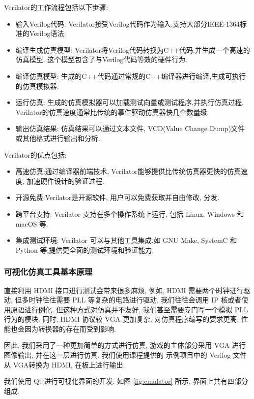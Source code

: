 Verilator的工作流程包括以下步骤: 

\begin{itemize}
    \item 输入Verilog代码: Verilator接受Verilog代码作为输入,支持大部分IEEE-1364标准的Verilog语法. 
    \item 编译生成仿真模型: Verilator将Verilog代码转换为C++代码,并生成一个高速的仿真模型. 这个模型包含了与Verilog代码等效的硬件行为. 
    \item 编译仿真模型: 生成的C++代码通过常规的C++编译器进行编译,生成可执行的仿真模拟器. 
    \item 运行仿真: 生成的仿真模拟器可以加载测试向量或测试程序,并执行仿真过程. Verilator的仿真速度通常比传统的事件驱动仿真器快几个数量级. 
    \item 输出仿真结果: 仿真结果可以通过文本文件, VCD(Value Change Dump)文件或其他格式进行输出和分析. 
\end{itemize}

Verilator的优点包括:

\begin{itemize}
    \item 高速仿真:通过编译器前端技术, Verilator能够提供比传统仿真器更快的仿真速度, 加速硬件设计的验证过程. 
    \item 开源免费:Verilator是开源软件, 用户可以免费获取并自由修改, 分发. 
    \item 跨平台支持: Verilator 支持在多个操作系统上运行, 包括 Linux, Windows 和 macOS 等. 
    \item 集成测试环境: Verilator 可以与其他工具集成,如 GNU Make, SystemC 和 Python 等,提供更全面的测试环境和验证能力. 
\end{itemize}

\subsubsection{可视化仿真工具基本原理}

直接利用 HDMI 接口进行测试会带来很多麻烦, 例如, HDMI 需要两个时钟进行驱动, 但多时钟往往需要 PLL 等复杂的电路进行驱动, 
我们往往会调用 IP 核或者使用原语进行例化. 但这种方式对仿真并不友好, 我们甚至需要专门写一个模拟 PLL 行为的模块. 
同时, HDMI 协议较 VGA 更加复杂, 对仿真程序编写的要求更高, 性能也会因为转换器的存在而受到影响.

因此, 我们采用了一种更加简单的方式进行仿真, 游戏的主体部分采用 VGA 进行图像输出, 并在这一层进行仿真. 我们使用课程提供的
示例项目中的 Verilog 文件从 VGA转换为 HDMI, 在板上进行输出. 

我们使用 Qt 进行可视化界面的开发. 如图 \ref{fig:emulator} 所示, 界面上共有四部分组成. 


